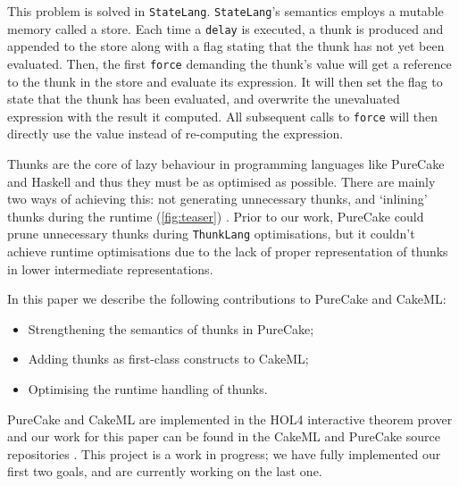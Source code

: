 \documentclass[sigconf]{acmart}
\newcommand{\code}[1]{\texttt{#1}}
\newcommand{\ThunkLang}{\code{ThunkLang}}
\newcommand{\StateLang}{\code{StateLang}}
\begin{document}
This problem is solved in \StateLang{}. \StateLang{}'s semantics employs a
mutable memory called a store. Each time a \code{delay} is executed, a thunk is
produced and appended to the store along with a flag stating that the thunk has
not yet been evaluated. Then, the first \code{force} demanding the thunk's value
will get a reference to the thunk in the store and evaluate its expression. It
will then set the flag to state that the thunk has been evaluated, and overwrite
the unevaluated expression with the result it computed. All subsequent calls to
\code{force} will then directly use the value instead of re-computing the
expression.

Thunks are the core of lazy behaviour in programming languages like PureCake and
Haskell and thus they must be as optimised as possible. There are mainly two
ways of achieving this: not generating unnecessary thunks, and `inlining' thunks
during the runtime (\autoref{fig:teaser}) \cite{lazygc}. Prior to our work,
PureCake could prune unnecessary thunks during \ThunkLang{} optimisations, but
it couldn't achieve runtime optimisations due to the lack of proper
representation of thunks in lower intermediate representations.

In this paper we describe the following contributions to PureCake and CakeML:
\begin{itemize}
\item Strengthening the semantics of thunks in PureCake;
\item Adding thunks as first-class constructs to CakeML;
\item Optimising the runtime handling of thunks.
\end{itemize}
PureCake and CakeML are implemented in the HOL4 interactive theorem prover
\cite{HOL} and our work for this paper can be found in the CakeML and PureCake
source repositories \cite{PureCakeGithub, CakeMLGithub}. This project is a work
in progress; we have fully implemented our first two goals, and are currently
working on the last one.
\end{document}

